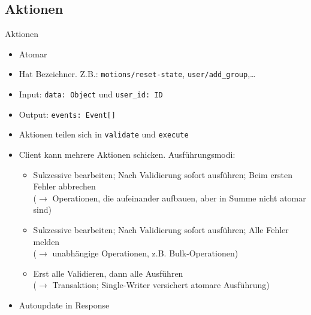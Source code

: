 \documentclass[10pt]{beamer}
\begin{document}
\subsection{Aktionen}
\begin{frame}{Aktionen}
	\begin{itemize}
		\item Atomar
		\item Hat Bezeichner. Z.B.: \texttt{motions/reset-state}, \texttt{user/add\_group},\ldots
		\item Input: \texttt{data: Object} und \texttt{user\_id: ID}
		\item Output: \texttt{events: Event[]}
		\item Aktionen teilen sich in \texttt{validate} und \texttt{execute}
		\item Client kann mehrere Aktionen schicken. Ausführungsmodi:
		\begin{itemize}
			\item Sukzessive bearbeiten; Nach Validierung sofort ausführen; Beim ersten Fehler abbrechen\\
			($\rightarrow$ Operationen, die aufeinander aufbauen, aber in Summe nicht atomar sind)
			\item Sukzessive bearbeiten; Nach Validierung sofort ausführen; Alle Fehler melden\\
			($\rightarrow$ unabhängige Operationen, z.B. Bulk-Operationen)
			\item Erst alle Validieren, dann alle Ausführen\\
			($\rightarrow$ Transaktion; Single-Writer versichert atomare Ausführung)
		\end{itemize}
		\item Autoupdate in Response
	\end{itemize}
\end{frame}
\end{document}
